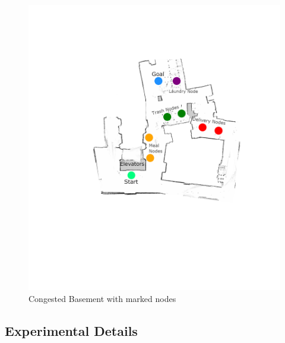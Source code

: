   \begin{figure}[!htb]
    \centering
    \includegraphics[width=\linewidth]{images/results/overlay.png}
    \caption{Congested Basement with marked nodes}
    \label{figure:basement_congestion}
  \end{figure}


  \subsection{ Experimental Details }

